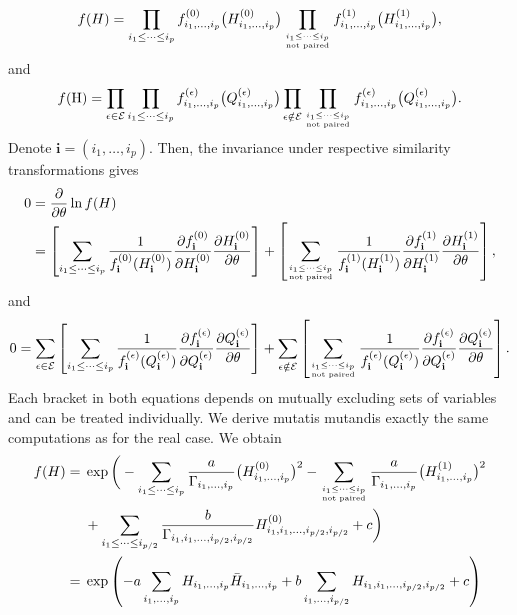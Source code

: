 \documentclass[pdftex]{sigma}
\numberwithin{equation}{section}
\theoremstyle{definition}
\begin{document}
\[ f(H)= \prod_{i_1\leq \dots \leq i_p} f_{i_1,\dots,i_p}^{(0)}\bigl(H^{(0)}_{i_1,\dots,i_p}\bigr) \prod_{ \genfrac{}{}{0pt}{}{i_1\leq \dots \leq i_p }{\text{not paired}} } f_{i_1,\dots,i_p}^{(1)}\bigl(H^{(1)}_{i_1,\dots,i_p}\bigr), \]
and
\[ f(\mathrm{H})= \prod_{\epsilon \in \mathcal{E}} \prod_{i_1\leq \dots \leq i_p} f_{i_1,\dots,i_p}^{(\epsilon)}\bigl(Q^{(\epsilon)}_{i_1,\dots,i_p}\bigr) \prod_{\epsilon \notin \mathcal{E}} \prod_{\genfrac{}{}{0pt}{}{i_1\leq \dots \leq i_p }{\text{not paired}} } f_{i_1,\dots,i_p}^{(\epsilon)}\bigl(Q^{(\epsilon)}_{i_1,\dots,i_p}\bigr). \]
Denote $\mathbf{i}=(i_1,\dots,i_p)$. Then, the invariance under respective similarity transformations gives
\begin{align*}
    0 &= \frac{\partial}{\partial \theta} \ln f(H) \\
    &= \left[\sum_{i_1\leq \dots \leq i_p} \frac{1}{f^{(0)}_{\mathbf{i}}(H^{(0)}_{\mathbf{i}})} \frac{\partial f^{(0)}_{\mathbf{i}}}{\partial H^{(0)}_{\mathbf{i}}} \frac{\partial H^{(0)}_{\mathbf{i}}}{\partial \theta} \right] + \left[ \sum_{\genfrac{}{}{0pt}{}{i_1\leq \dots \leq i_p }{\text{not paired}} } \frac{1}{f^{(1)}_{\mathbf{i}}(H^{(1)}_{\mathbf{i}})} \frac{\partial f^{(1)}_{\mathbf{i}}}{\partial H^{(1)}_{\mathbf{i}}} \frac{\partial H^{(1)}_{\mathbf{i}}}{\partial \theta} \right] ,
\end{align*}
and
\[ 0= \sum_{\epsilon \in \mathcal{E}} \left[ \sum_{i_1\leq \dots \leq i_p} \frac{1}{f^{(\epsilon)}_{\mathbf{i}}(Q^{(\epsilon)}_{\mathbf{i}})} \frac{\partial f^{(\epsilon)}_{\mathbf{i}}}{\partial Q^{(\epsilon)}_{\mathbf{i}}} \frac{\partial Q^{(\epsilon)}_{\mathbf{i}}}{\partial \theta} \right] + \sum_{\epsilon \notin \mathcal{E}} \left[ \sum_{\genfrac{}{}{0pt}{}{i_1\leq \dots \leq i_p }{\text{not paired}} } \frac{1}{f^{(\epsilon)}_{\mathbf{i}}(Q^{(\epsilon)}_{\mathbf{i}})} \frac{\partial f^{(\epsilon)}_{\mathbf{i}}}{\partial Q^{(\epsilon)}_{\mathbf{i}}} \frac{\partial Q^{(\epsilon)}_{\mathbf{i}}}{\partial \theta} \right].\]
Each bracket in both equations depends on mutually excluding sets of variables and can be treated individually. We derive mutatis mutandis exactly the same computations as for the real case. We obtain
\begin{align*}
    f(H)={}& \exp \bigg( -\sum_{i_1\leq\dots\leq i_p} \frac{a}{\Gamma_{i_1,\dots,i_p} } \bigl(H^{(0)}_{i_{1},\dots,i_p}\bigr)^2 - \sum_{\genfrac{}{}{0pt}{}{i_1\leq \dots \leq i_p }{\text{not paired}} } \frac{a}{\Gamma_{i_1,\dots,i_p}} \bigl(H^{(1)}_{i_{1},\dots,i_p}\bigr)^2 \\
    & + \sum_{i_1 \leq\dots \leq i_{p/2}} \frac{b}{\Gamma_{i_1,i_1,\dots,i_{p/2},i_{p/2}}} H^{(0)}_{i_1,i_1,\dots,i_{p/2},i_{p/2}} +c \bigg) \\
    ={}& \exp \left( -a \sum_{i_1,\dots,i_p} H_{i_{1},\dots,i_p} \bar H_{i_1,\dots,i_p} + b \sum_{i_1,\dots, i_{p/2}} H_{i_1,i_1,\dots,i_{p/2},i_{p/2}} +c \right)
\end{align*}
\end{document}

